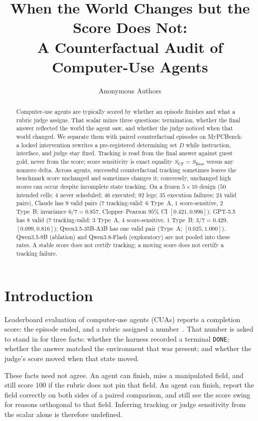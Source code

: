 \documentclass{article}
\title{When the World Changes but the Score Does Not:\\
A Counterfactual Audit of Computer-Use Agents}
\author{Anonymous Authors}
\begin{document}
\maketitle

\begin{abstract}
Computer-use agents are typically scored by whether an episode finishes and what a rubric judge assigns.
That scalar mixes three questions: termination, whether the final answer reflected the world the agent saw, and whether the judge noticed when that world changed.
We separate them with paired counterfactual episodes on MyPCBench: a locked intervention rewrites a pre-registered determining set $D$ while instruction, interface, and judge stay fixed.
Tracking is read from the final answer against guest gold, never from the score; score sensitivity is exact equality $S_{\mathrm{CF}}=S_{\mathrm{Base}}$ versus any nonzero delta.
Across agents, successful counterfactual tracking sometimes leaves the benchmark score unchanged and sometimes changes it; conversely, unchanged high scores can occur despite incomplete state tracking.
On a frozen $5{\times}10$ design ($50$ intended cells; $4$ never scheduled; $46$ executed; $92$ legs; $35$ execution failures; $24$ valid pairs), Claude has $9$ valid pairs ($7$ tracking-valid: $6$ Type~A, $1$ score-sensitive, $2$ Type~B; invariance $6/7=0.857$, Clopper--Pearson $95\%$ CI $[0.421,0.996]$); GPT-5.5 has $8$ valid ($7$ tracking-valid: $3$ Type~A, $4$ score-sensitive, $1$ Type~B; $3/7=0.429$, $[0.099,0.816]$); Qwen3.5-35B-A3B has one valid pair (Type~A; $[0.025,1.000]$).
Qwen3.5-9B (ablation) and Qwen3.8-Flash (exploratory) are not pooled into these rates.
A stable score does not certify tracking; a moving score does not certify a tracking failure.
\end{abstract}

\section{Introduction}

Leaderboard evaluation of computer-use agents (CUAs) reports a completion score: the episode ended, and a rubric assigned a number~\citep{jang2026mypcbench,xie2024osworld}.
That number is asked to stand in for three facts: whether the harness recorded a terminal \texttt{DONE}; whether the answer matched the environment that was present; and whether the judge's score moved when that state moved.

These facts need not agree.
An agent can finish, miss a manipulated field, and still score $100$ if the rubric does not pin that field.
An agent can finish, report the field correctly on both sides of a paired comparison, and still see the score swing for reasons orthogonal to that field.
Inferring tracking or judge sensitivity from the scalar alone is therefore undefined.
\end{document}

